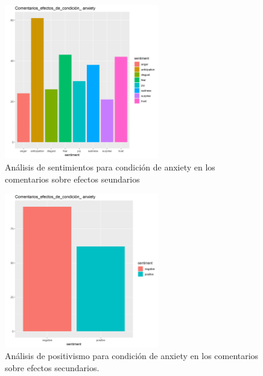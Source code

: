 \documentclass[spanish,]{article}
\begin{document}
\begin{figure}[h]
    \centering
    \includegraphics[width=0.6\textwidth]{figuras/sentimientos/Banxiety1.png}
    \caption{Análisis de sentimientos para condición de anxiety en los comentarios sobre efectos seundarios}
    \label{fig:sentimientos:7}
\end{figure}

\begin{figure}[h]
    \centering
    \includegraphics[width=0.6\textwidth]{figuras/sentimientos/Banxiety2.png}
    \caption{Análisis de positivismo para condición de anxiety en los comentarios sobre efectos secundarios.}
    \label{fig:sentimientos:8}
\end{figure}
\end{document}
